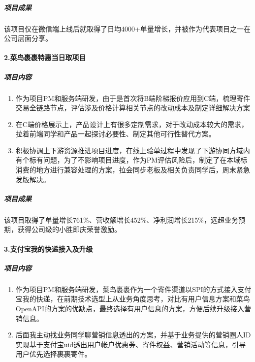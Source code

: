\subparagraph{项目成果}\label{ux9879ux76eeux6210ux679c-3}

该项目仅在微信端上线后就取得了日均4000+单量增长，并被作为代表项目之一在公司层面分享。

\paragraph{2.菜鸟裹裹特惠当日取项目}\label{ux83dcux9e1fux88f9ux88f9ux7279ux60e0ux5f53ux65e5ux53d6ux9879ux76ee}

\subparagraph{项目内容}\label{ux9879ux76eeux5185ux5bb9-4}

\begin{enumerate}
\def\labelenumi{\arabic{enumi}.}
\tightlist
\item
  作为项目PM和服务端研发，由于是首次将B端阶梯报价应用到C端，梳理寄件交易全链路节点，评估涉及价格计算相关节点的改动成本及制定详细解决方案
\item
  在C端价格展示上，产品设计上有很多定制需求，对于改动成本较大的需求，拉着前端同学和产品一起探讨必要性、制定其他可行性替代方案。
\item
  积极协调上下游资源推进项目进度，在线上验单过程中发现了下游协同方域内有个标有问题，为了不影响项目进度，作为PM评估风险后，制定了在本域标消费的地方进行兼容处理的方案，拉会同步老板及相关负责同学后，周末紧急发版解决。
\end{enumerate}

\subparagraph{项目成果}\label{ux9879ux76eeux6210ux679c-4}

该项目取得了单量增长761\%、营收额增长452\%、净利润增长215\%，远超业务预期，获得公司级的小胜即庆荣誉激励。

\paragraph{3.支付宝我的快递接入及升级}\label{ux652fux4ed8ux5b9dux6211ux7684ux5febux9012ux63a5ux5165ux53caux5347ux7ea7}

\subparagraph{项目内容}\label{ux9879ux76eeux5185ux5bb9-5}

\begin{enumerate}
\def\labelenumi{\arabic{enumi}.}
\tightlist
\item
  作为项目PM和服务端研发，菜鸟裹裹作为一个寄件渠道以SPI的方式接入支付宝我的快递，在前期技术选型上从业务角度思考，对比有用户信息方案和菜鸟OpenAPI的方案的优缺点，最终选择有用户信息的方案，方便后续升级接入营销信息。
\item
  后面我主动找业务同学聊营销信息透出的方案，并基于业务提供的营销圈人ID实现基于支付宝uid透出用户帐户优惠券、寄件权益、营销活动等信息，引导用户优先选择裹裹寄件。
\end{enumerate}

